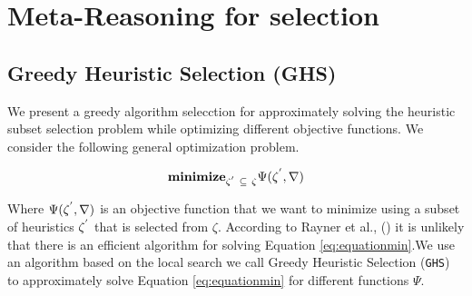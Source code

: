 
 
\chapter{Meta-Reasoning for selection}\label{ch:rghs}

\section{Greedy Heuristic Selection (GHS)}
\noindent
We present a greedy algorithm selecction for approximately solving the heuristic subset selection problem while optimizing different objective functions. We consider the following general optimization problem.

\begin{equation}
\begin{split}
\textbf{minimize}_{\zeta\sp{'}\ \subseteq\ \zeta}\Psi(\zeta\sp{'}, \nabla) \\
\end{split}
\label{eq:equationmin}
\end{equation}

Where $\Psi(\zeta\sp{'},\nabla)$ is an objective function that we want to minimize using a subset of heuristics $\zeta\sp{'}$ that is selected from $\zeta$. According to Rayner et al., (\citeyear{raynersss13}) it is unlikely that there is an efficient algorithm for solving Equation \ref{eq:equationmin}.We use an algorithm based on the local search we call Greedy Heuristic Selection (\texttt{GHS}) to approximately solve Equation \ref{eq:equationmin} for different functions $\Psi$.

